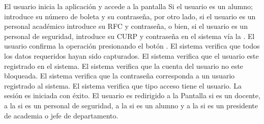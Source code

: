 \begin{UCtrayectoria}
\UCpaso[\UCactor] El usuario inicia la aplicación y accede a la pantalla 
\UCpaso[\UCactor] Si el usuario es un alumno; introduce su número de boleta y su contraseña, por otro lado, si el usuario es un personal académico introduce su RFC y contraseña, o bien, si el usuario es un personal de seguridad, introduce su CURP y contraseña en el sistema vía la \label{CU01.introduceDatos}.
\UCpaso[\UCactor] El usuario confirma la operación presionando el botón .
\UCpaso El sistema verifica que todos los datos requeridos hayan sido capturados.
\UCpaso El sistema verifica que el usuario este registrado en el sistema.
\UCpaso El sistema verifica que la cuenta del usuario no este bloqueada.
\UCpaso El sistema verifica que la contraseña corresponda a un usuario registrado al sistema.
\UCpaso El sistema verifica que tipo acceso tiene el usuario.
\UCpaso La sesión es iniciada con éxito.
\UCpaso El usuario es redirigido a la {Pantalla  si es un docente, a la  si es un personal de seguridad, a la  si es un alumno y a la  si es un presidente de academia o jefe de departamento}.
\end{UCtrayectoria}




